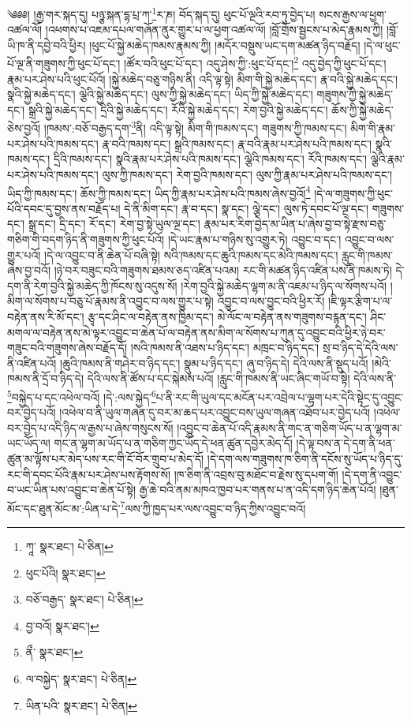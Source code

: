\setcounter{footnote}{0} 
༄༅༅། །རྒྱ་གར་སྐད་དུ། པཉྩ་སྐན་དྷ་པྲ་ཀ་\footnote{ཀཱ་  སྣར་ཐང་།  པེ་ཅིན། }ར་ཎ། བོད་སྐད་དུ། ཕུང་པོ་ལྔའི་རབ་ཏུ་བྱེད་པ། སངས་རྒྱས་ལ་ཕྱག་འཚལ་ལོ། །འཕགས་པ་འཇམ་དཔལ་གཞོན་ནུར་གྱུར་པ་ལ་ཕྱག་འཚལ་ལོ། །བློ་གྲོས་སྦྱངས་པ་མེད་རྣམས་ཀྱི། །བློ་ཡི་ཁ་ནི་དབྱེ་བའི་ཕྱིར། །ཕུང་པོ་སྐྱེ་མཆེད་ཁམས་རྣམས་ཀྱི། །མདོར་བསྡུས་ཡང་དག་མཚན་ཉིད་བརྗོད། །དེ་ལ་ཕུང་པོ་ལྔ་ནི་གཟུགས་ཀྱི་ཕུང་པོ་དང་། །ཚོར་བའི་ཕུང་པོ་དང་། འདུ་ཤེས་ཀྱི་:ཕུང་པོ་དང་།\footnote{ཕུང་པོའི།  སྣར་ཐང་། } འདུ་བྱེད་ཀྱི་ཕུང་པོ་དང་། རྣམ་པར་ཤེས་པའི་ཕུང་པོའོ། །སྐྱེ་མཆེད་བཅུ་གཉིས་ནི། འདི་ལྟ་སྟེ། མིག་གི་སྐྱེ་མཆེད་དང་། རྣ་བའི་སྐྱེ་མཆེད་དང་། སྣའི་སྐྱེ་མཆེད་དང་། ལྕེའི་སྐྱེ་མཆེད་དང་། ལུས་ཀྱི་སྐྱེ་མཆེད་དང་། ཡིད་ཀྱི་སྐྱེ་མཆེད་དང་། གཟུགས་ཀྱི་སྐྱེ་མཆེད་དང་། སྒྲའི་སྐྱེ་མཆེད་དང་། དྲིའི་སྐྱེ་མཆེད་དང་། རོའི་སྐྱེ་མཆེད་དང་། རེག་བྱའི་སྐྱེ་མཆེད་དང་། ཆོས་ཀྱི་སྐྱེ་མཆེད་ཅེས་བྱའོ། །ཁམས་:བཅོ་བརྒྱད་དག་\footnote{བཅོ་བརྒྱད་  སྣར་ཐང་།  པེ་ཅིན། }ནི། འདི་ལྟ་སྟེ། མིག་གི་ཁམས་དང་། གཟུགས་ཀྱི་ཁམས་དང་། མིག་གི་རྣམ་པར་ཤེས་པའི་ཁམས་དང་། རྣ་བའི་ཁམས་དང་། སྒྲའི་ཁམས་དང་། རྣ་བའི་རྣམ་པར་ཤེས་པའི་ཁམས་དང་། སྣའི་ཁམས་དང་། དྲིའི་ཁམས་དང་། སྣའི་རྣམ་པར་ཤེས་པའི་ཁམས་དང་། ལྕེའི་ཁམས་དང་། རོའི་ཁམས་དང་། ལྕེའི་རྣམ་པར་ཤེས་པའི་ཁམས་དང་། ལུས་ཀྱི་ཁམས་དང་། རེག་བྱའི་ཁམས་དང་། ལུས་ཀྱི་རྣམ་པར་ཤེས་པའི་ཁམས་དང་། ཡིད་ཀྱི་ཁམས་དང་། ཆོས་ཀྱི་ཁམས་དང་། ཡིད་ཀྱི་རྣམ་པར་ཤེས་པའི་ཁམས་ཞེས་བྱའོ།\footnote{བྱ་བའོ།  སྣར་ཐང་། } །དེ་ལ་གཟུགས་ཀྱི་ཕུང་པོའི་དབང་དུ་བྱས་ནས་བརྗོད་པ། དེ་ནི་མིག་དང་། རྣ་བ་དང་། སྣ་དང་། ལྕེ་དང་། ལུས་ཏེ་དབང་པོ་ལྔ་དང་། གཟུགས་དང་། སྒྲ་དང་། དྲི་དང་། རོ་དང་། རེག་བྱ་སྟེ་ཡུལ་ལྔ་དང་། རྣམ་པར་རིག་བྱེད་མ་ཡིན་པ་ཞེས་བྱ་བ་སྟེ་རྫས་བཅུ་གཅིག་གི་བདག་ཉིད་ནི་གཟུགས་ཀྱི་ཕུང་པོའོ། །དེ་ཡང་རྣམ་པ་གཉིས་སུ་འགྱུར་ཏེ། འབྱུང་བ་དང་། འབྱུང་བ་ལས་གྱུར་པའོ། །དེ་ལ་འབྱུང་བ་ནི་ཆེན་པོ་བཞི་སྟེ། སའི་ཁམས་དང་ཆུའི་ཁམས་དང་མེའི་ཁམས་དང་། རླུང་གི་ཁམས་ཞེས་བྱ་བའོ། །ཉེ་བར་བཟུང་བའི་གཟུགས་ཐམས་ཅད་འཛིན་པའམ། རང་གི་མཚན་ཉིད་འཛིན་པས་ནི་ཁམས་ཏེ། དེ་དག་ནི་རེག་བྱའི་སྐྱེ་མཆེད་ཀྱི་ཁོངས་སུ་འདུས་སོ། །རེག་བྱའི་སྐྱེ་མཆེད་ལྷག་མ་ནི་འཇམ་པ་ཉིད་ལ་སོགས་པའོ། །མིག་ལ་སོགས་པ་བཅུ་པོ་རྣམས་ནི་འབྱུང་བ་ལས་གྱུར་པ་སྟེ། འབྱུང་བ་ལས་བྱུང་བའི་ཕྱིར་རོ། །ཇི་ལྟར་རྩིག་པ་ལ་བརྟེན་ནས་རི་མོ་དང་། རྩྭ་དང་ཤིང་ལ་བརྟེན་ནས་ཁྱིམ་དང་། མེ་ལོང་ལ་བརྟེན་ནས་གཟུགས་བརྙན་དང་། ཤིང་མགལ་ལ་བརྟེན་ནས་མེ་ལྟར་འབྱུང་བ་ཆེན་པོ་ལ་བརྟེན་ནས་མིག་ལ་སོགས་པ་ཀུན་དུ་འབྱུང་བའི་ཕྱིར་ཉེ་བར་གཟུང་བའི་གཟུགས་ཞེས་བརྗོད་དོ། །སའི་ཁམས་ནི་འཐས་པ་ཉིད་དང་། མཁྲང་བ་ཉིད་དང་། སྲ་བ་ཉིད་དེ་དེའི་ལས་ནི་འཛིན་པའོ། །ཆུའི་ཁམས་ནི་གཤེར་བ་ཉིད་དང་། སྣུམ་པ་ཉིད་དང་། ཞུ་བ་ཉིད་དེ། དེའི་ལས་ནི་སྡུད་པའོ། །མེའི་ཁམས་ནི་དྲོ་བ་ཉིད་དེ། དེའི་ལས་ནི་ཚོས་པ་དང་སྐེམས་པའོ། །རླུང་གི་ཁམས་ནི་ཡང་ཞིང་གཡོ་བ་སྟེ། དེའི་ལས་ནི་\footnote{ནྀ་  སྣར་ཐང་། }བསྐྱེད་པ་དང་འཕེལ་བའོ། །དེ་:ལས་སྐྱེད་\footnote{ལ་བསྐྱེད་  སྣར་ཐང་།  པེ་ཅིན། }པ་ནི་རང་གི་ཡུལ་དང་མངོན་པར་འབྲེལ་པ་ལྷག་པར་དེའི་སྟེང་དུ་འབྱུང་བར་བྱེད་པའོ། །འཕེལ་བ་ནི་ཡུལ་གཞན་དུ་བར་མ་ཆད་པར་འབྱུང་བས་ཡུལ་གཞན་འཐོབ་པར་བྱེད་པའོ། །འཕེལ་བར་བྱེད་པ་འདི་ཉིད་ལ་རྒྱས་པ་ཞེས་གསུངས་སོ། །འབྱུང་བ་ཆེན་པོ་འདི་རྣམས་ནི་གང་ན་གཅིག་ཡོད་པ་ན་ལྷག་མ་ཡང་ཡོད་ལ། གང་ན་ལྷག་མ་ཡོད་པ་ན་གཅིག་ཀྱང་ཡོད་དེ་ཕན་ཚུན་དབྱེར་མེད་དོ། །དེ་ལྟ་བས་ན་དེ་དག་ནི་ཕན་ཚུན་མ་ལྟོས་པར་མེད་པས་རང་གི་ངོ་བོར་གྲུབ་པ་མེད་དོ། །དེ་དག་ལས་གཟུགས་ཁ་ཅིག་ནི་དངོས་སུ་ཡོད་པ་ཉིད་དུ་རང་གི་དབང་པོའི་རྣམ་པར་ཤེས་པས་རྟོགས་སོ། །ཁ་ཅིག་ནི་འབྲས་བུ་མཐོང་བ་རྗེས་སུ་དཔག་གོ། །དེ་དག་ནི་འབྱུང་བ་ཡང་ཡིན་པས་འབྱུང་བ་ཆེན་པོ་སྟེ། རྒྱ་ཆེ་བའི་ནམ་མཁའ་ཁྱབ་པར་གནས་པ་ན་འདི་དག་ཉིད་ཆེན་པོའོ། །ཐུན་མོང་དང་ཐུན་མོང་མ་:ཡིན་པ་དེ་\footnote{ཡིན་པའི་  སྣར་ཐང་།  པེ་ཅིན། }ལས་ཀྱི་ཁྱད་པར་ལས་འབྱུང་བ་ཉིད་ཀྱིས་འབྱུང་བའོ། 